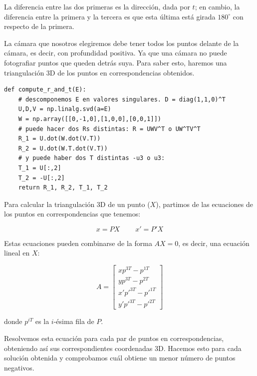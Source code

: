 \documentclass[11pt,a4paper]{article}
\theoremstyle{plain}
\theoremstyle{definition}
\begin{document}
La diferencia entre las dos primeras es la dirección, dada por $t$; en cambio, la diferencia entre la primera y la tercera  es que esta última está girada $180^{\circ}$ con respecto de la primera. 

La cámara que nosotros elegiremos debe tener todos los puntos delante de la cámara, es decir, con profundidad positiva. Ya que una cámara no puede fotografiar puntos que queden detrás suya. Para saber esto, haremos una triangulación 3D de los puntos en correspondencias obtenidos.

\begin{verbatim}
def compute_r_and_t(E):
    # descomponemos E en valores singulares. D = diag(1,1,0)^T
    U,D,V = np.linalg.svd(a=E)
    W = np.array([[0,-1,0],[1,0,0],[0,0,1]])
    # puede hacer dos Rs distintas: R = UWV^T o UW^TV^T
    R_1 = U.dot(W.dot(V.T))
    R_2 = U.dot(W.T.dot(V.T))
    # y puede haber dos T distintas -u3 o u3:
    T_1 = U[:,2]
    T_2 = -U[:,2]
    return R_1, R_2, T_1, T_2
\end{verbatim}

Para calcular la triangulación 3D de un punto ($X$), partimos de las ecuaciones de los puntos en correspondencias que tenemos: 

\begin{displaymath}
x = PX \qquad\ x' = P'X
\end{displaymath}

Estas ecuaciones pueden combinarse de la forma $AX = 0$, es decir, una ecuación lineal en $X$:

\begin{displaymath}
A = \left[ \begin{matrix}
x p^{3T} - p^{1T} \\
y p^{3T} - p^{2T} \\
x' p'^{3T} - p'^{1T} \\
y' p'^{3T} - p'^{2T}
\end{matrix} \right]
\end{displaymath}

donde $p^{iT}$ es la $i$-ésima fila de $P$.

Resolvemos esta ecuación para cada par de puntos en correspondencias, obteniendo así sus correspondientes coordenadas 3D. Hacemos esto para cada solución obtenida y comprobamos cuál obtiene un menor número de puntos negativos.
\end{document}
